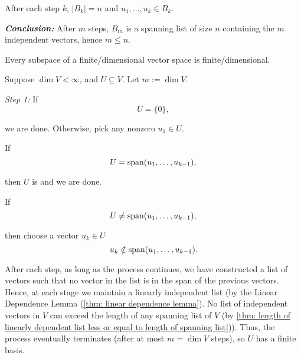 \begin{prf}
  After each step $k$, $\lvert B_k\rvert = n$ and $u_1,\dots,u_k\in B_k$.

  \emph{\bfseries Conclusion:} After $m$ steps, $B_m$ is a spanning list of size $n$ containing the $m$ independent vectors, hence $m \leq n$.
\end{prf}

\setcounter{thm}{24}
\begin{thm} 
  \label{thm: finite-dimensional subspace}
  Every subspace of a finite\-/dimensional vector space is finite\-/dimensional.
\end{thm}
\begin{prf}
  Suppose $\dim V<\infty$, and $U\subseteq V$. Let $m := \dim V$.

  \emph{Step 1:} If
  \begin{equation}
    U = \{0\},
  \end{equation}

  we are done. Otherwise, pick any nonzero $u_1 \in U$.

   If
  \begin{equation}
    U = \operatorname{span} (u_1, \ldots, u_{k-1}),
  \end{equation}

  then $U$ is \fd and we are done.

  If
  \begin{equation}
    U \neq \operatorname{span} (u_1, \ldots, u_{k-1}),
  \end{equation}

  then choose a vector $u_k \in U$ \st
  \begin{equation}
    u_k \notin \operatorname{span} (u_1, \ldots, u_{k-1}).
  \end{equation}

  After each step, as long as the process continues, we have constructed a list of vectors such that no vector in the list is in the span of the previous vectors. Hence, at each stage we maintain a linearly independent list (by the Linear Dependence Lemma (\ref{thm: linear dependence lemma}). No list of independent vectors in $V$ can exceed the length of any spanning list of $V$ (by \ref{thm: length of linearly dependent list less or equal to length of spanning list})).
  Thus, the process eventually terminates (after at most $m=\dim V$ steps), so $U$ has a finite basis.
\end{prf}